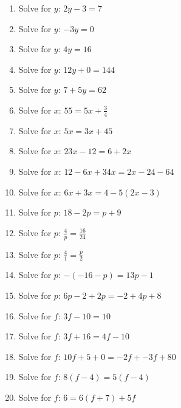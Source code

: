         \label{m39241*id148396}\begin{enumerate}[noitemsep, label=\textbf{\arabic*}. ] 
            \label{m39241*uid11}\item Solve for $y$: $2y-3=7$\hspace{1ex}        
\label{m39241*uid12}\item Solve for $y$: $-3y=0$\hspace{1ex}        
\label{m39241*uid13}\item Solve for $y$: $4y=16$\hspace{1ex}        
\label{m39241*uid14}\item Solve for $y$: $12y+0=144$\hspace{1ex}        
\label{m39241*uid15}\item Solve for $y$: $7+5y=62$\hspace{1ex}        
\label{m39241*uid16}\item Solve for $x$: $55=5x+\frac{3}{4}$\hspace{1ex}        
\label{m39241*uid17}\item Solve for $x$: $5x=3x+45$\hspace{1ex}        
\label{m39241*uid18}\item Solve for $x$: $23x-12=6+2x$\hspace{1ex}        
\label{m39241*uid19}\item Solve for $x$: $12-6x+34x=2x-24-64$\hspace{1ex}        
\label{m39241*uid20}\item Solve for $x$: $6x+3x=4-5\left(2x-3\right)$\hspace{1ex}        
\label{m39241*uid21}\item Solve for $p$: $18-2p=p+9$\hspace{1ex}        
\label{m39241*uid22}\item Solve for $p$: $\frac{4}{p}=\frac{16}{24}$\hspace{1ex}        
\label{m39241*uid23}\item Solve for $p$: $\frac{4}{1}=\frac{p}{2}$\hspace{1ex}        
\label{m39241*uid24}\item Solve for $p$: $-\left(-16-p\right)=13p-1$\hspace{1ex}        
\label{m39241*uid25}\item Solve for $p$: $6p-2+2p=-2+4p+8$\hspace{1ex}        
\label{m39241*uid26}\item Solve for $f$: $3f-10=10$\hspace{1ex}        
\label{m39241*uid27}\item Solve for $f$: $3f+16=4f-10$\hspace{1ex}        
\label{m39241*uid28}\item Solve for $f$: $10f+5+0=-2f+-3f+80$\hspace{1ex}        
\label{m39241*uid29}\item Solve for $f$: $8\left(f-4\right)=5\left(f-4\right)$\hspace{1ex}        
\label{m39241*uid30}\item Solve for $f$: $6=6\left(f+7\right)+5f$\hspace{1ex}        
\end{enumerate}
